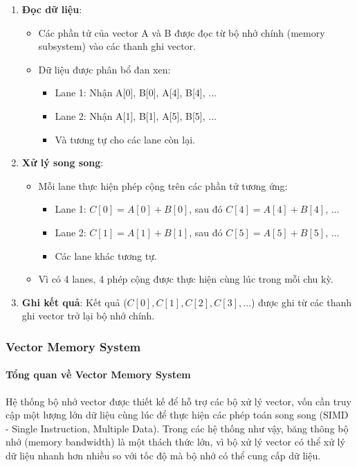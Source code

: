 \documentclass[a4paper]{article}
\begin{document}
\begin{enumerate}
    \item \textbf{Đọc dữ liệu}:
    \begin{itemize}
        \item Các phần tử của vector A và B được đọc từ bộ nhớ chính (memory subsystem) vào các thanh ghi vector.
        \item Dữ liệu được phân bổ đan xen:
        \begin{itemize}
            \item Lane 1: Nhận A[0], B[0], A[4], B[4], ...
            \item Lane 2: Nhận A[1], B[1], A[5], B[5], ...
            \item Và tương tự cho các lane còn lại.
        \end{itemize}
    \end{itemize}
    
    \item \textbf{Xử lý song song}:
    \begin{itemize}
        \item Mỗi lane thực hiện phép cộng trên các phần tử tương ứng:
        \begin{itemize}
            \item Lane 1: $C[0] = A[0] + B[0]$, sau đó $C[4] = A[4] + B[4]$, ...
            \item Lane 2: $C[1] = A[1] + B[1]$, sau đó $C[5] = A[5] + B[5]$, ...
            \item Các lane khác tương tự.
        \end{itemize}
        \item Vì có 4 lanes, 4 phép cộng được thực hiện cùng lúc trong mỗi chu kỳ.
    \end{itemize}
    
    \item \textbf{Ghi kết quả}: Kết quả ($C[0], C[1], C[2], C[3], ...$) được ghi từ các thanh ghi vector trở lại bộ nhớ chính.
\end{enumerate}

\subsubsection{Vector Memory System}
\paragraph{Tổng quan về Vector Memory System}
Hệ thống bộ nhớ vector được thiết kế để hỗ trợ các bộ xử lý vector, vốn cần truy cập một lượng lớn dữ liệu cùng lúc để thực hiện các phép toán song song (SIMD - Single Instruction, Multiple Data). Trong các hệ thống như vậy, băng thông bộ nhớ (memory bandwidth) là một thách thức lớn, vì bộ xử lý vector có thể xử lý dữ liệu nhanh hơn nhiều so với tốc độ mà bộ nhớ có thể cung cấp dữ liệu.
\end{document}
